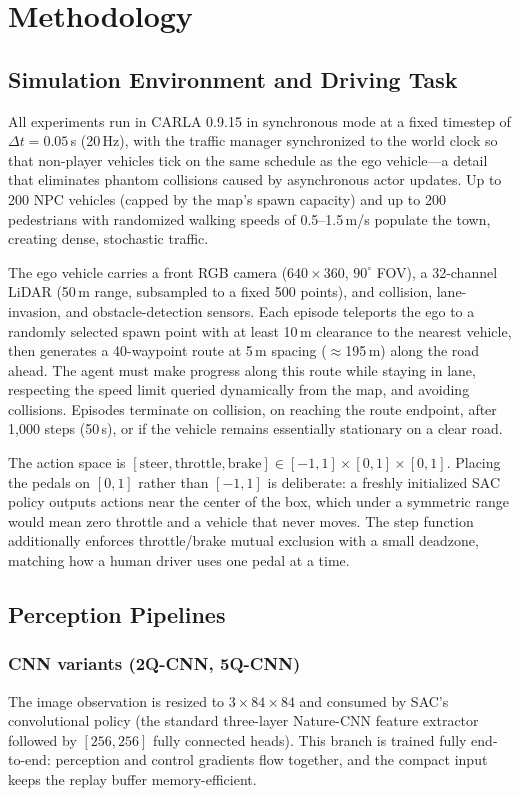\documentclass[conference]{IEEEtran}
\begin{document}
\section{Methodology}

\subsection{Simulation Environment and Driving Task}
All experiments run in CARLA 0.9.15 in synchronous mode at a fixed timestep of $\Delta t = 0.05$\,s (20\,Hz), with the traffic manager synchronized to the world clock so that non-player vehicles tick on the same schedule as the ego vehicle---a detail that eliminates phantom collisions caused by asynchronous actor updates. Up to 200 NPC vehicles (capped by the map's spawn capacity) and up to 200 pedestrians with randomized walking speeds of 0.5--1.5\,m/s populate the town, creating dense, stochastic traffic.

The ego vehicle carries a front RGB camera ($640{\times}360$, $90^{\circ}$ FOV), a 32-channel LiDAR (50\,m range, subsampled to a fixed 500 points), and collision, lane-invasion, and obstacle-detection sensors. Each episode teleports the ego to a randomly selected spawn point with at least 10\,m clearance to the nearest vehicle, then generates a 40-waypoint route at 5\,m spacing ($\approx$195\,m) along the road ahead. The agent must make progress along this route while staying in lane, respecting the speed limit queried dynamically from the map, and avoiding collisions. Episodes terminate on collision, on reaching the route endpoint, after 1{,}000 steps (50\,s), or if the vehicle remains essentially stationary on a clear road.

The action space is $[\text{steer}, \text{throttle}, \text{brake}] \in [-1,1] \times [0,1] \times [0,1]$. Placing the pedals on $[0,1]$ rather than $[-1,1]$ is deliberate: a freshly initialized SAC policy outputs actions near the center of the box, which under a symmetric range would mean zero throttle and a vehicle that never moves. The step function additionally enforces throttle/brake mutual exclusion with a small deadzone, matching how a human driver uses one pedal at a time.

\subsection{Perception Pipelines}
\subsubsection{CNN variants (2Q-CNN, 5Q-CNN)}
The image observation is resized to $3{\times}84{\times}84$ and consumed by SAC's convolutional policy (the standard three-layer Nature-CNN feature extractor followed by $[256,256]$ fully connected heads). This branch is trained fully end-to-end: perception and control gradients flow together, and the compact input keeps the replay buffer memory-efficient.
\end{document}
